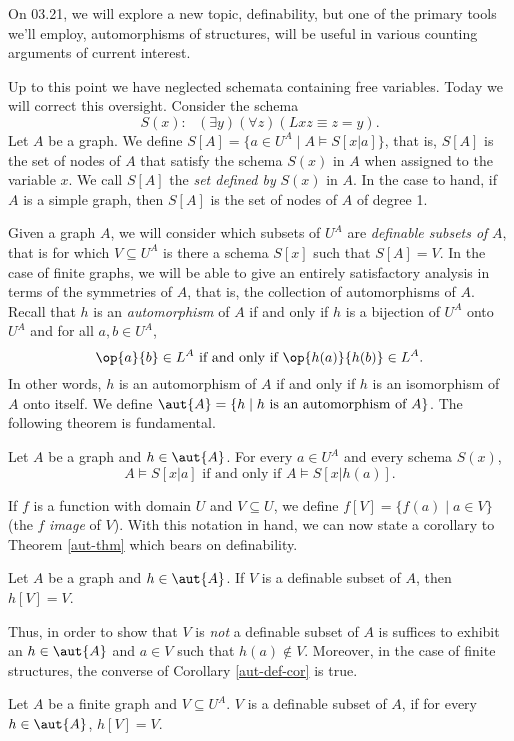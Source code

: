 On 03.21, we will explore a new topic, definability, but one of the primary tools we'll employ, automorphisms of structures, will be useful in various counting arguments of current interest.

Up to this point we have neglected schemata containing free variables. Today we will correct this oversight. Consider the schema 
\[
S(x):\ \ \ (\exists y)(\forall z)(Lxz\equiv z=y).
\]
Let $A$ be a graph. We define $S[A]=\{a\in U^A\mid A\models S[x|a]\}$, that is, $S[A]$ is the set of nodes of $A$ that satisfy the schema $S(x)$ in $A$ when assigned to the variable $x$. We call $S[A]$ the \emph{set defined by} $S(x)$ in $A$. In the case to hand, if $A$ is a simple graph, then $S[A]$ is the set of nodes of $A$ of degree 1. 

Given a graph $A$, we will consider which subsets of $U^A$ are \emph{definable subsets of} $A$, that is for which $V\subseteq U^A$ is there a schema $S[x]$ such that $S[A]=V$. In the case of finite graphs, we will be able to give an entirely satisfactory analysis in terms of the symmetries of $A$, that is, the collection of automorphisms of $A$. Recall that $h$ is an \emph{automorphism} of $A$ if and only if $h$ is a bijection of $U^A$ onto $U^A$ and for all $a,b\in U^A$,
\[
\op{a}{b}\in L^A\mbox{ if and only if } \op{h(a)}{h(b)}\in L^A.
\]
In other words, $h$ is an automorphism of $A$ if and only if $h$ is an isomorphism of $A$ onto itself. We define $\aut{A}=\{h\mid h\mbox{ is an automorphism of }A\}$. The following theorem is fundamental.
\begin{theorem}\label{aut-thm}
Let $A$ be a graph and $h\in\aut{A}$. For every $a\in U^A$ and every schema $S(x)$,
\[
A\models S[x|a]\mbox{ if and only if }A\models S[x|h(a)]. 
\]
\end{theorem}
If $f$ is a function with domain $U$ and $V\subseteq U$, we define $f[V]=\{f(a)\mid a\in V\}$ (the $f$ \emph{image} of $V$). With this notation in hand, we can now state a corollary to Theorem \ref{aut-thm} which bears on definability.
\begin{corollary}\label{aut-def-cor}
Let $A$ be a graph and $h\in\aut{A}$. If $V$ is a definable subset of $A$, then $h[V]=V$.
\end{corollary}
Thus, in order to show that $V$ is \emph{not} a definable subset of $A$ is suffices to exhibit an $h\in\aut{A}$ and $a\in V$ such that $h(a)\not\in V$. Moreover, in the case of finite structures, the converse of Corollary \ref{aut-def-cor} is true.
\begin{theorem}\label{fin-aut-def-thm}
Let $A$ be a finite graph and $V\subseteq U^A$. $V$ is a definable subset of $A$, if for every $h\in\aut{A}$, $h[V]=V$.
\end{theorem} 
